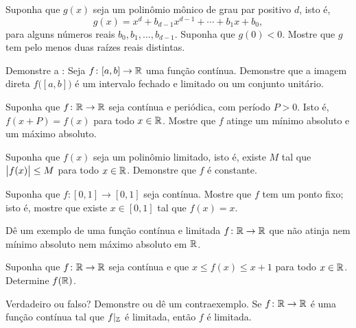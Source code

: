 \begin{exercise}
Suponha que $g(x)$ seja um polinômio mônico de grau par positivo $d$, isto é,
\begin{equation*}
g(x) = x^d + b_{d-1} x^{d-1} + \cdots + b_1 x + b_0 ,
\end{equation*}
para alguns números reais $b_{0}, b_1, \ldots, b_{d-1}$. Suponha
que $g(0) < 0$. Mostre que $g$ tem pelo menos duas raízes reais distintas.
\end{exercise}

\begin{exercise}
Demonstre a :
Seja $f \colon [a,b] \to {\mathbb{R}}$ uma função contínua. Demonstre
que a imagem direta $f\bigl([a,b]\bigr)$ é um intervalo fechado e limitado ou
um conjunto unitário.
\end{exercise}

\begin{exercise}
Suponha que $f \colon {\mathbb{R}} \to {\mathbb{R}}$ seja contínua e periódica, com período
$P > 0$. Isto é, $f(x+P) = f(x)$ para todo $x \in {\mathbb{R}}$. Mostre que $f$
atinge um mínimo absoluto e um máximo absoluto.
\end{exercise}

\begin{exercise}[Desafiador]
Suponha que $f(x)$ seja um polinômio limitado,
isto é, existe $M$ tal que $\bigl\lvert {f(x)} \bigr\rvert \leq M$
para todo $x \in {\mathbb{R}}$. Demonstre que $f$ é constante.
\end{exercise}

\begin{exercise}
Suponha que $f \colon [0,1] \to [0,1]$ seja contínua. Mostre que $f$
tem um ponto fixo; isto é, mostre que existe $x \in [0,1]$ tal que
$f(x) = x$.
\end{exercise}

\begin{exercise}
Dê um exemplo de uma função contínua e limitada $f \colon {\mathbb{R}} \to {\mathbb{R}}$ que
não atinja nem mínimo absoluto nem máximo absoluto em ${\mathbb{R}}$.
\end{exercise}

\begin{exercise}
Suponha que $f \colon {\mathbb{R}} \to {\mathbb{R}}$ seja contínua e que
$x \leq f(x) \leq x+1$ para todo $x \in {\mathbb{R}}$. Determine $f({\mathbb{R}})$.
\end{exercise}

\begin{exercise}
Verdadeiro ou falso? Demonstre ou dê um contraexemplo. Se $f \colon {\mathbb{R}} \to
{\mathbb{R}}$ é uma função contínua tal que $f|_{{\mathbb{Z}}}$ é limitada, então $f$
é limitada.
\end{exercise}

